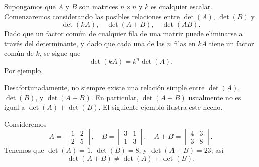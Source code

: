 Supongamos que $A$ y $B$ son matrices $n \times n$ y $k$ es cualquier escalar. Comenzaremos considerando las posibles relaciones entre $\det(A)$, $\det(B)$ y
$$\det(kA), \quad \det(A + B), \quad \det(AB).$$
Dado que un factor común de cualquier fila de una matriz puede eliminarse a través del determinante, y dado que cada una de las $n$ filas en $kA$ tiene un factor común de $k$, se sigue que
$$\det(kA) = k^n \det(A).$$
Por ejemplo,
\begin{matrizn}
\end{matrizn}
Desafortunadamente, no siempre existe una relación simple entre $\det(A)$, $\det(B)$, y $\det(A + B)$. En particular, $\det(A + B)$ usualmente no es igual a $\det(A) + \det(B)$. El siguiente ejemplo ilustra este hecho.

\begin{examplebox}{}{}
    Consideremos
    $$A = \begin{bmatrix} 1 & 2 \\ 2 & 5 \end{bmatrix}, \quad B = \begin{bmatrix} 3 & 1 \\ 1 & 3 \end{bmatrix}, \quad A + B = \begin{bmatrix} 4 & 3 \\ 3 & 8 \end{bmatrix}.$$
    Tenemos que $\det(A) = 1$, $\det(B) = 8$, y $\det(A + B) = 23$; así
    $$\det(A + B) \neq \det(A) + \det(B).$$
\end{examplebox}

\newpage

